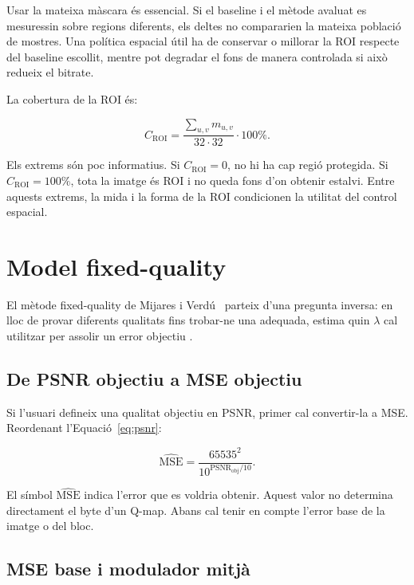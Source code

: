 Usar la mateixa màscara és essencial. Si el baseline i el mètode avaluat es
mesuressin sobre regions diferents, els deltes no compararien la mateixa
població de mostres. Una política espacial útil ha de conservar o millorar la
ROI respecte del baseline escollit, mentre pot degradar el fons de manera
controlada si això redueix el bitrate.

La cobertura de la ROI és:

\begin{equation}
C_{\mathrm{ROI}}=
\frac{\sum_{u,v}m_{u,v}}{32\cdot32}\cdot100\%.
\label{eq:roi_coverage}
\end{equation}

Els extrems són poc informatius. Si $C_{\mathrm{ROI}}=0$, no hi ha cap regió
protegida. Si $C_{\mathrm{ROI}}=100\%$, tota la imatge és ROI i no queda fons
d'on obtenir estalvi. Entre aquests extrems, la mida i la forma de la ROI
condicionen la utilitat del control espacial.

\section{Model fixed-quality}\label{sec:model_fq}

El mètode fixed-quality de Mijares i Verdú \etal\ parteix d'una pregunta
inversa: en lloc de provar diferents qualitats fins trobar-ne una adequada,
estima quin $\lambda$ cal utilitzar per assolir un error objectiu
\cite{mijares2024fixed}.

\subsection{De PSNR objectiu a MSE objectiu}

Si l'usuari defineix una qualitat objectiu en PSNR, primer cal convertir-la a
MSE. Reordenant l'Equació~\ref{eq:psnr}:

\begin{equation}
\widehat{\mathrm{MSE}}=
\frac{65535^2}
{10^{\mathrm{PSNR}_{\mathrm{obj}}/10}}.
\label{eq:target_mse}
\end{equation}

El símbol $\widehat{\mathrm{MSE}}$ indica l'error que es voldria obtenir. Aquest
valor no determina directament el byte d'un Q-map. Abans cal tenir en compte
l'error base de la imatge o del bloc.

\subsection{MSE base i modulador mitjà}

